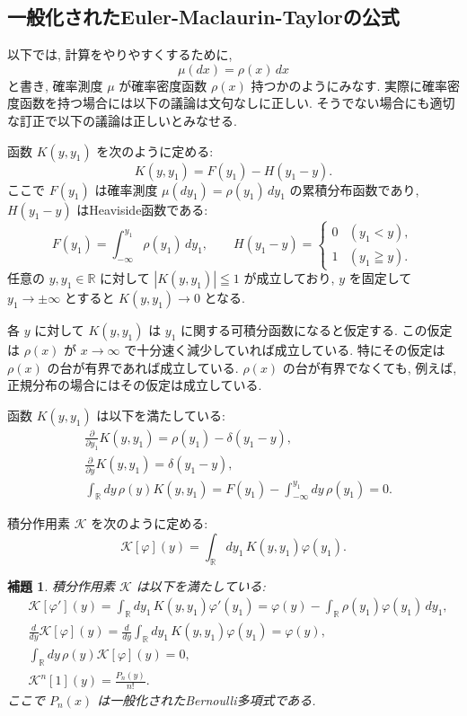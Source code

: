 \documentclass[12pt,twoside]{jarticle}
\newcommand\R{{\mathbb R}} %
\renewcommand\d{\partial}
\newcommand\K{{\mathscr K}}
\theoremstyle{jplain}
\newtheorem{lemma}[theorem]{補題}
\theoremstyle{jplain}
\theoremstyle{jplain}
\numberwithin{theorem}{section}
\numberwithin{equation}{section}
\numberwithin{figure}{section}
\numberwithin{table}{section}
\begin{document}



\subsection{一般化されたEuler-Maclaurin-Taylorの公式}

以下では, 計算をやりやすくするために,
\[
\mu(dx) = \rho(x)\,dx
\]
と書き, 確率測度 $\mu$ が確率密度函数 $\rho(x)$ 持つかのようにみなす.
実際に確率密度函数を持つ場合には以下の議論は文句なしに正しい.
そうでない場合にも適切な訂正で以下の議論は正しいとみなせる.

函数 $K(y,y_1)$ を次のように定める:
\[
K(y,y_1) = F(y_1) - H(y_1-y).
\]
ここで $F(y_1)$ は確率測度 $\mu(dy_1)=\rho(y_1)\,dy_1$ の累積分布函数であり,
$H(y_1-y)$ はHeaviside函数である:
\[
F(y_1) = \int_{-\infty}^{y_1}\rho(y_1)\,dy_1,
\qquad
H(y_1-y) = \begin{cases}
0 & (y_1<y), \\
1 & (y_1\geqq y).
\end{cases}
\]
任意の $y,y_1\in\R$ に対して $|K(y,y_1)|\leqq 1$ が成立しており,
$y$ を固定して $y_1\to\pm\infty$ とすると $K(y,y_1)\to 0$ となる.

各 $y$ に対して $K(y,y_1)$ は $y_1$ に関する可積分函数になると仮定する.
この仮定は $\rho(x)$ が $x\to\infty$ で十分速く減少していれば成立している.
特にその仮定は $\rho(x)$ の台が有界であれば成立している.
$\rho(x)$ の台が有界でなくても,
例えば, 正規分布の場合にはその仮定は成立している.

函数 $K(y,y_1)$ は以下を満たしている:
\begin{align*}
  &
  \frac\d{\d y_1}K(y,y_1) = \rho(y_1) - \delta(y_1-y),
  \\ &
  \frac\d{\d y}K(y,y_1) = \delta(y_1-y),
  \\ &
  \int_\R dy\,\rho(y)K(y,y_1)
  = F(y_1) - \int_{-\infty}^{y_1}dy\,\rho(y_1)
  = 0.
\end{align*}

積分作用素 $\K$ を次のように定める:
\[
\K[\varphi](y) = \int_\R dy_1\,K(y,y_1)\varphi(y_1).
\]

\begin{lemma}
  \label{lemma:K}
  積分作用素 $\K$ は以下を満たしている:
  \begin{align*}
    &
    \K[\varphi'](y)
    = \int_\R dy_1\,K(y,y_1)\varphi'(y_1)
    = \varphi(y) - \int_\R\rho(y_1)\varphi(y_1)\,dy_1,
    \\ &
    \frac{d}{dy}\K[\varphi](y)
    = \frac{d}{dy}\int_\R dy_1\,K(y,y_1)\varphi(y_1)
    = \varphi(y),
    \\ &
    \int_\R dy\,\rho(y)\K[\varphi](y) = 0,
    \\ &
    \K^n[1](y) = \frac{P_n(y)}{n!}.
  \end{align*}
  ここで $P_n(x)$ は一般化されたBernoulli多項式である.
\end{lemma}
\end{document}

